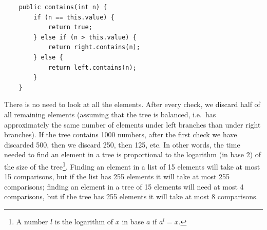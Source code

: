 \begin{verbatim}
    public contains(int n) {
        if (n == this.value) {
            return true;
        } else if (n > this.value) {
            return right.contains(n);
        } else {
            return left.contains(n);
        }            
    }
\end{verbatim}

There is no need to look at all the elements. After every check, we
discard half of all remaining elements (assuming that the tree is
balanced, i.e.~has approximately the same number of elements under left
branches than under right branches). If the tree contains 1000
numbers, after the first check we have discarded 500, then we discard
250, then 125, etc. In other words, the time needed to find an element
in a tree is proportional to the logarithm (in base 2) of the size of
the tree\footnote{A number $l$ is the logarithm of $x$ in base $a$ if
 $a^l = x$.}. Finding an element in a list of 15 elements will take at
most 15 comparisons, but if the list has 255 elements it will take at
most 255 comparisons; finding an element in a tree of 15 elements will
need at most 4 comparisons, but if the tree has 255 elements it will
take at most 8 comparisons. 



